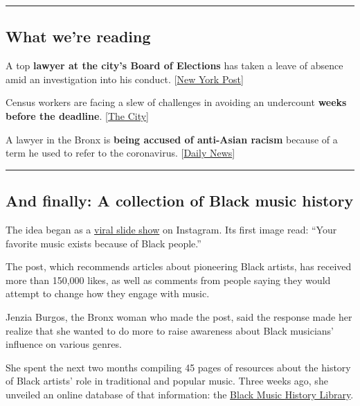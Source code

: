 \begin{center}\rule{0.5\linewidth}{\linethickness}\end{center}

\hypertarget{what-were-reading}{%
\subsection{What we're reading}\label{what-were-reading}}

A top \textbf{lawyer at the city's Board of Elections} has taken a leave
of absence amid an investigation into his conduct.
{[}\href{https://nypost.com/2020/09/01/nyc-board-of-elections-lawyer-takes-leave-amid-investigation/}{New
York Post}{]}

Census workers are facing a slew of challenges in avoiding an undercount
\textbf{weeks before the deadline}.
{[}\href{https://www.thecity.nyc/2020/8/31/21409347/census-workers-final-month-of-nyc-count}{The
City}{]}

A lawyer in the Bronx is \textbf{being accused of anti-Asian racism}
because of a term he used to refer to the coronavirus.
{[}\href{https://www.nydailynews.com/new-york/ny-bronx-attorney-chinese-cooties-coronavirus-email-20200901-v4ifwlmvlbczvovtqfj7dkiqby-story.html}{Daily
News}{]}

\begin{center}\rule{0.5\linewidth}{\linethickness}\end{center}

\hypertarget{and-finally-a-collection-of-black-music-history}{%
\subsection{And finally: A collection of Black music
history}\label{and-finally-a-collection-of-black-music-history}}

The idea began as a
\href{https://www.instagram.com/p/CBBYMINjC6E/}{viral slide show} on
Instagram. Its first image read: ``Your favorite music exists because of
Black people.''

The post, which recommends articles about pioneering Black artists, has
received more than 150,000 likes, as well as comments from people saying
they would attempt to change how they engage with music.

Jenzia Burgos, the Bronx woman who made the post, said the response made
her realize that she wanted to do more to raise awareness about Black
musicians' influence on various genres.

She spent the next two months compiling 45 pages of resources about the
history of Black artists' role in traditional and popular music. Three
weeks ago, she unveiled an online database of that information: the
\href{https://blackmusiclibrary.com/Library}{Black Music History
Library}.

